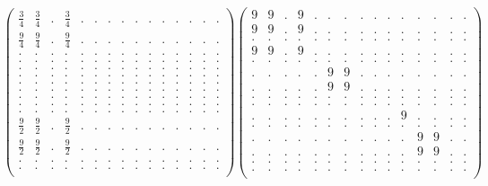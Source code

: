 \documentclass[12pt,a4paper]{amsart}
\begin{document}
\begin{align*}
\left(\begin{array}{rrrrrrrrrrrrrrr}%
\frac34&\frac34&.&\frac34&.&.&.&.&.&.&.&.&.&.&.\\%
\frac{9}{4}&\frac{9}{4}&.&\frac{9}{4}&.&.&.&.&.&.&.&.&.&.&.\\%
.&.&.&.&.&.&.&.&.&.&.&.&.&.&.\\%
.&.&.&.&.&.&.&.&.&.&.&.&.&.&.\\%
.&.&.&.&.&.&.&.&.&.&.&.&.&.&.\\%
.&.&.&.&.&.&.&.&.&.&.&.&.&.&.\\%
.&.&.&.&.&.&.&.&.&.&.&.&.&.&.\\%
.&.&.&.&.&.&.&.&.&.&.&.&.&.&.\\%
.&.&.&.&.&.&.&.&.&.&.&.&.&.&.\\%
.&.&.&.&.&.&.&.&.&.&.&.&.&.&.\\%
.&.&.&.&.&.&.&.&.&.&.&.&.&.&.\\%
\frac{9}{2}&\frac{9}{2}&.&\frac{9}{2}&.&.&.&.&.&.&.&.&.&.&.\\%
\frac{9}{2}&\frac{9}{2}&.&\frac{9}{2}&.&.&.&.&.&.&.&.&.&.&.\\%
.&.&.&.&.&.&.&.&.&.&.&.&.&.&.\\%
.&.&.&.&.&.&.&.&.&.&.&.&.&.&.\\%
\end{array}\right)%
\left(\begin{array}{rrrrrrrrrrrrrrr}%
9&9&.&9&.&.&.&.&.&.&.&.&.&.&.\\%
9&9&.&9&.&.&.&.&.&.&.&.&.&.&.\\%
.&.&.&.&.&.&.&.&.&.&.&.&.&.&.\\%
9&9&.&9&.&.&.&.&.&.&.&.&.&.&.\\%
.&.&.&.&.&.&.&.&.&.&.&.&.&.&.\\%
.&.&.&.&.&9&9&.&.&.&.&.&.&.&.\\%
.&.&.&.&.&9&9&.&.&.&.&.&.&.&.\\%
.&.&.&.&.&.&.&.&.&.&.&.&.&.&.\\%
.&.&.&.&.&.&.&.&.&.&.&.&.&.&.\\%
.&.&.&.&.&.&.&.&.&.&9&.&.&.&.\\%
.&.&.&.&.&.&.&.&.&.&.&.&.&.&.\\%
.&.&.&.&.&.&.&.&.&.&.&9&9&.&.\\%
.&.&.&.&.&.&.&.&.&.&.&9&9&.&.\\%
.&.&.&.&.&.&.&.&.&.&.&.&.&.&.\\%
.&.&.&.&.&.&.&.&.&.&.&.&.&.&.\\%
\end{array}\right)%
\end{align*}
\end{document}
